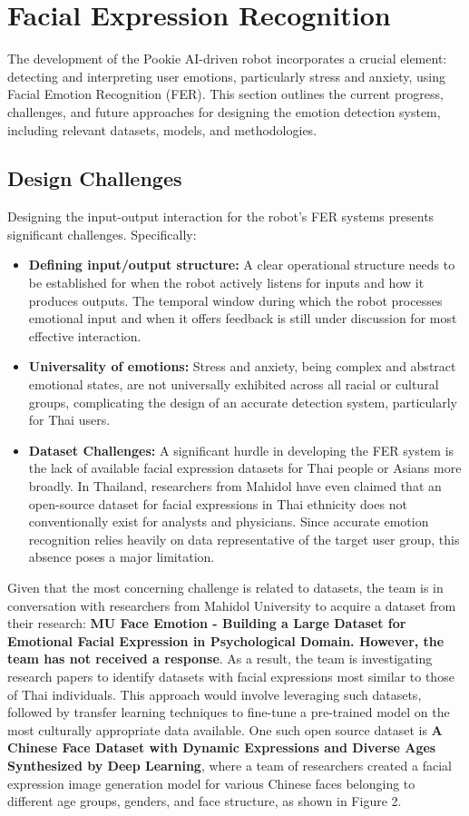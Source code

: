 \section{Facial Expression Recognition}
The development of the Pookie AI-driven robot incorporates a crucial element: detecting and interpreting user emotions, particularly stress and anxiety, using Facial Emotion Recognition (FER). This section outlines the current progress, challenges, and future approaches for designing the emotion detection system, including relevant datasets, models, and methodologies.
\subsection{Design Challenges}
Designing the input-output interaction for the robot’s FER systems presents significant challenges. Specifically:
\begin{itemize}
    \item \textbf{Defining input/output structure:} A clear operational structure needs to be established for when the robot actively listens for inputs and how it produces outputs. The temporal window during which the robot processes emotional input and when it offers feedback is still under discussion for most effective interaction.
    \item \textbf{Universality of emotions:} Stress and anxiety, being complex and abstract emotional states, are not universally exhibited across all racial or cultural groups, complicating the design of an accurate detection system, particularly for Thai users.
    \item \textbf{Dataset Challenges:} A significant hurdle in developing the FER system is the lack of available facial expression datasets for Thai people or Asians more broadly. In Thailand, researchers from Mahidol have even claimed that an open-source dataset for facial expressions in Thai ethnicity does not conventionally exist for analysts and physicians. Since accurate emotion recognition relies heavily on data representative of the target user group, this absence poses a major limitation.
\end{itemize}

Given that the most concerning challenge is related to datasets, the team is in conversation with researchers from Mahidol University to acquire a dataset from their research: \textbf{MU Face Emotion - Building a Large Dataset for Emotional Facial Expression in Psychological Domain. However, the team has not received a response}\cite{mu2022}. As a result, the team is investigating research papers to identify datasets with facial expressions most similar to those of Thai individuals. This approach would involve leveraging such datasets, followed by transfer learning techniques to fine-tune a pre-trained model on the most culturally appropriate data available. One such open source dataset is \textbf{A Chinese Face Dataset with Dynamic Expressions and Diverse Ages Synthesized by Deep Learning}\cite{han2023}, where a team of researchers created a facial expression image generation model for various Chinese faces belonging to different age groups, genders, and face structure, as shown in Figure 2.


